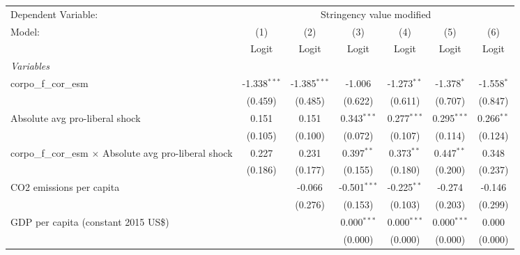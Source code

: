 
\begingroup
\centering
\begin{tabular}{lcccccc}
   \toprule
   Dependent Variable: & \multicolumn{6}{c}{Stringency value modified}\\
   Model:                                                         & (1)            & (2)            & (3)            & (4)           & (5)           & (6)\\  
                                                                  &  Logit         & Logit          & Logit          & Logit         & Logit         & Logit\\  
   \midrule
   \emph{Variables}\\
   corpo\_f\_cor\_esm                                             & -1.338$^{***}$ & -1.385$^{***}$ & -1.006         & -1.273$^{**}$ & -1.378$^{*}$  & -1.558$^{*}$\\   
                                                                  & (0.459)        & (0.485)        & (0.622)        & (0.611)       & (0.707)       & (0.847)\\   
   Absolute avg pro-liberal shock                                 & 0.151          & 0.151          & 0.343$^{***}$  & 0.277$^{***}$ & 0.295$^{***}$ & 0.266$^{**}$\\   
                                                                  & (0.105)        & (0.100)        & (0.072)        & (0.107)       & (0.114)       & (0.124)\\   
   corpo\_f\_cor\_esm $\times$ Absolute avg pro-liberal shock     & 0.227          & 0.231          & 0.397$^{**}$   & 0.373$^{**}$  & 0.447$^{**}$  & 0.348\\   
                                                                  & (0.186)        & (0.177)        & (0.155)        & (0.180)       & (0.200)       & (0.237)\\   
   CO2 emissions per capita                                       &                & -0.066         & -0.501$^{***}$ & -0.225$^{**}$ & -0.274        & -0.146\\   
                                                                  &                & (0.276)        & (0.153)        & (0.103)       & (0.203)       & (0.299)\\   
   GDP per capita (constant 2015 US\$)                            &                &                & 0.000$^{***}$  & 0.000$^{***}$ & 0.000$^{***}$ & 0.000\\   
                                                                  &                &                & (0.000)        & (0.000)       & (0.000)       & (0.000)\\   

\end{tabular}
